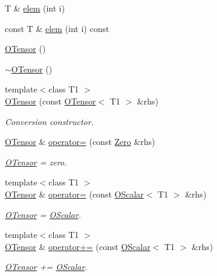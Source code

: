 \begin{DoxyCompactItemize}
T \& \mbox{\hyperlink{classENSEM_1_1OTensor_a18a4095f1e99228c27768fbea8eec05d}{elem}} (int i)
\item 
const T \& \mbox{\hyperlink{classENSEM_1_1OTensor_a788f146a247856d6b391cfd8f903657b}{elem}} (int i) const
\item 
\mbox{\hyperlink{classENSEM_1_1OTensor_a514d20086c92e7b19386708978d34483}{O\+Tensor}} ()
\item 
\mbox{\hyperlink{classENSEM_1_1OTensor_a7be6a7cdba7403be29ede1f21ee706f7}{$\sim$\+O\+Tensor}} ()
\item 
{\footnotesize template$<$class T1 $>$ }\\\mbox{\hyperlink{classENSEM_1_1OTensor_a49dbc01d4f79e52900b10dd220cdc546}{O\+Tensor}} (const \mbox{\hyperlink{classENSEM_1_1OTensor}{O\+Tensor}}$<$ T1 $>$ \&rhs)
\begin{DoxyCompactList}\small\item\em Conversion constructor. \end{DoxyCompactList}\item 
\mbox{\hyperlink{classENSEM_1_1OTensor}{O\+Tensor}} \& \mbox{\hyperlink{classENSEM_1_1OTensor_aae562552ce915d3d39c65dfe463fa50a}{operator=}} (const \mbox{\hyperlink{structENSEM_1_1Zero}{Zero}} \&rhs)
\begin{DoxyCompactList}\small\item\em \mbox{\hyperlink{classENSEM_1_1OTensor}{O\+Tensor}} = zero. \end{DoxyCompactList}\item 
{\footnotesize template$<$class T1 $>$ }\\\mbox{\hyperlink{classENSEM_1_1OTensor}{O\+Tensor}} \& \mbox{\hyperlink{classENSEM_1_1OTensor_ae763ca68be1d6b8d5b27b8d544ab5f2d}{operator=}} (const \mbox{\hyperlink{classENSEM_1_1OScalar}{O\+Scalar}}$<$ T1 $>$ \&rhs)
\begin{DoxyCompactList}\small\item\em \mbox{\hyperlink{classENSEM_1_1OTensor}{O\+Tensor}} = \mbox{\hyperlink{classENSEM_1_1OScalar}{O\+Scalar}}. \end{DoxyCompactList}\item 
{\footnotesize template$<$class T1 $>$ }\\\mbox{\hyperlink{classENSEM_1_1OTensor}{O\+Tensor}} \& \mbox{\hyperlink{classENSEM_1_1OTensor_a93fe0d4638104ad0f6bdaf5de7760276}{operator+=}} (const \mbox{\hyperlink{classENSEM_1_1OScalar}{O\+Scalar}}$<$ T1 $>$ \&rhs)
\begin{DoxyCompactList}\small\item\em \mbox{\hyperlink{classENSEM_1_1OTensor}{O\+Tensor}} += \mbox{\hyperlink{classENSEM_1_1OScalar}{O\+Scalar}}. \end{DoxyCompactList}\item 

\end{DoxyCompactItemize}
